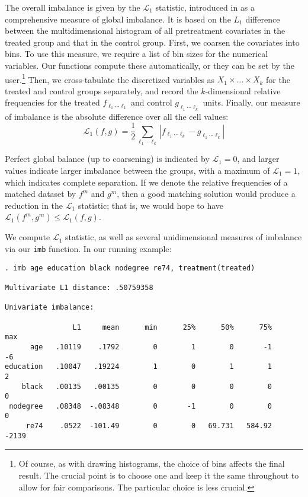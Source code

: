 \documentclass[11pt,titlepage]{article}
\begin{document}
The overall imbalance is given by the $\mathcal L_1$ statistic,
introduced in \citet{IacKinPor12} as a comprehensive measure of global
imbalance.  It is based on the $L_1$ difference between the
multidimensional histogram of all pretreatment covariates in the
treated group and that in the control group.  First, we coarsen the
covariates into bins. To use this measure, we require a list of bin
sizes for the numerical variables.  Our functions compute these
automatically, or they can be set by the user.\footnote{Of course, as
  with drawing histograms, the choice of bins affects the final
  result.  The crucial point is to choose one and keep it the same
  throughout to allow for fair comparisons.  The particular choice is
  less crucial.}  Then, we cross-tabulate the discretized variables as
$X_1\times \dots \times X_k$ for the treated and control groups
separately, and record the $k$-dimensional relative frequencies for
the treated $f_{\ell_1\cdots \ell_k}$ and control $g_{\ell_1\cdots
  \ell_k}$ units.  Finally, our measure of imbalance is the absolute
difference over all the cell values:
\begin{equation}
  \mathcal L_1(f,g) = \frac12 \sum_{\ell_1  \cdots \ell_k} 
  |f_{\ell_1\cdots \ell_k} - g_{\ell_1\cdots \ell_k}|
  \label{eq:L1}
\end{equation}

Perfect global balance (up to coarsening) is indicated by $\mathcal
L_1=0$, and larger values indicate larger imbalance between the
groups, with a maximum of $\mathcal L_1=1$, which indicates complete
separation. If we denote the relative frequencies of a matched dataset
by $f^m$ and $g^m$, then a good matching solution would produce a
reduction in the $\mathcal L_1$ statistic; that is, we would hope to
have $\mathcal L_1(f^m, g^m) \leq \mathcal L_1(f,g)$.

We compute $\mathcal L_1$ statistic, as well as several unidimensional
measures of imbalance via our \texttt{imb} function.  In our
running example:

\begin{verbatim}
. imb age education black nodegree re74, treatment(treated)

Multivariate L1 distance: .50759358

Univariate imbalance:

                L1     mean      min      25%      50%      75%      max
      age   .10119    .1792        0        1        0       -1       -6
education   .10047   .19224        1        0        1        1        2
    black   .00135   .00135        0        0        0        0        0
 nodegree   .08348  -.08348        0       -1        0        0        0
     re74    .0522  -101.49        0        0   69.731   584.92    -2139

\end{verbatim}
\end{document}
